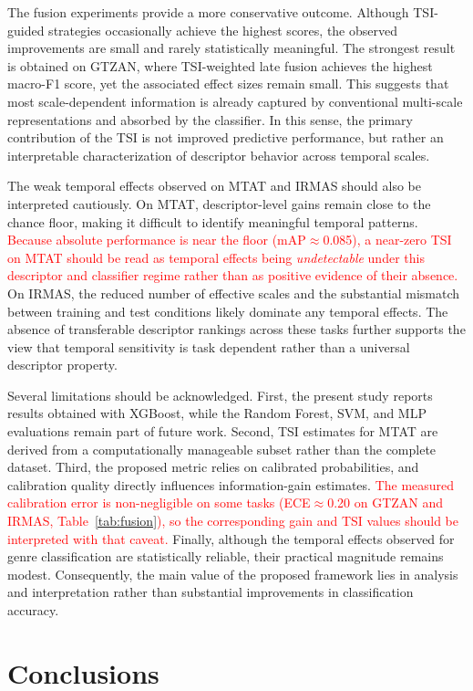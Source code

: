 \documentclass[runningheads]{llncs}
\begin{document}
The fusion experiments provide a more conservative outcome. Although TSI-guided strategies occasionally achieve the highest scores, the observed improvements are small and rarely statistically meaningful. The strongest result is obtained on GTZAN, where TSI-weighted late fusion achieves the highest macro-F1 score, yet the associated effect sizes remain small. This suggests that most scale-dependent information is already captured by conventional multi-scale representations and absorbed by the classifier. In this sense, the primary contribution of the TSI is not improved predictive performance, but rather an interpretable characterization of descriptor behavior across temporal scales.

The weak temporal effects observed on MTAT and IRMAS should also be interpreted cautiously. On MTAT, descriptor-level gains remain close to the chance floor, making it difficult to identify meaningful temporal patterns. \textcolor{red}{Because absolute performance is near the floor (mAP$\approx$0.085), a near-zero TSI on MTAT should be read as temporal effects being \emph{undetectable} under this descriptor and classifier regime rather than as positive evidence of their absence.} On IRMAS, the reduced number of effective scales and the substantial mismatch between training and test conditions likely dominate any temporal effects. The absence of transferable descriptor rankings across these tasks further supports the view that temporal sensitivity is task dependent rather than a universal descriptor property.

Several limitations should be acknowledged. First, the present study reports results obtained with XGBoost, while the Random Forest, SVM, and MLP evaluations remain part of future work. Second, TSI estimates for MTAT are derived from a computationally manageable subset rather than the complete dataset. Third, the proposed metric relies on calibrated probabilities, and calibration quality directly influences information-gain estimates. \textcolor{red}{The measured calibration error is non-negligible on some tasks (ECE$\approx$0.20 on GTZAN and IRMAS, Table~\ref{tab:fusion}), so the corresponding gain and TSI values should be interpreted with that caveat.} Finally, although the temporal effects observed for genre classification are statistically reliable, their practical magnitude remains modest. Consequently, the main value of the proposed framework lies in analysis and interpretation rather than substantial improvements in classification accuracy.

\section{Conclusions}
\end{document}
